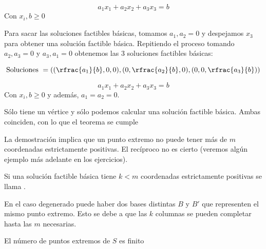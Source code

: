 \begin{example}
\[a_1x_1 + a_2x_2 + a_3x_3 = b\]
Con $x_i,b \geq 0$

Para sacar las soluciones factibles básicas, tomamos $a_1,a_2 = 0$ y despejamos $x_3$ para obtener una solución factible básica. Repitiendo el proceso tomando $a_2,a_3 = 0$ y $a_3,a_1 = 0$ obtenemos las 3 soluciones factibles básicas:

\[
\text{Soluciones } = \left( (\rfrac{a_1}{b},0,0), (0,\rfrac{a_2}{b},0) , (0,0,\rfrac{a_3}{b}) \right)
\]

\begin{figure}[h]
\centering
{}
\end{figure}

\end{example}

\begin{example}
\[a_1x_1 + a_2x_2 + a_3x_3 = b\]
Con $x_i,b \geq 0$ y además, $a_1 = a_2 = 0$.

Sólo tiene un vértice y sólo podemos calcular una solución factible básica. Ambas coinciden, con lo que el teorema se cumple

\end{example}



La demostración implica que un punto extremo  no puede tener más de $m$ coordenadas estrictamente positivas. El recíproco no es cierto (veremos algún ejemplo más adelante en los ejercicios).

Si una solución factible básica tiene $k<m$ coordenadas estrictamente positivas se llama .

En el caso degenerado puede haber dos bases distintas $B$ y $B'$ que representen el mismo punto extremo. Esto se debe a que las $k$ columnas se pueden completar hasta las $m$ necesarias.


\begin{theorem}
El número de puntos extremos de $S$ es finito 
\end{theorem}

